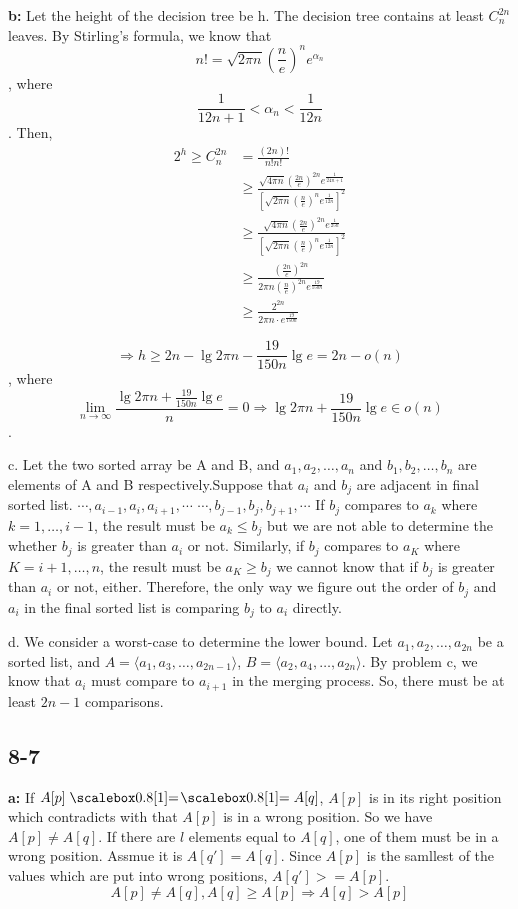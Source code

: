 \documentclass{book}
\begin{document}
\begin{CJK}{UTF8}{gkai}
\textbf{b:} Let the height of the decision tree be h. The decision tree contains 
at least $C^{2n}_n$ leaves.  By Stirling's formula, we know that $$n! = \sqrt{2\pi 
n}(\frac{n}{e})^ne^{\alpha_n}$$, where $$\frac{1}{12n+1} < \alpha_n < 
\frac{1}{12n}$$. Then,
\begin{align*}
2^h \geq C^{2n}_n &= \frac{(2n)!}{n!n!} \\
& \geq \frac{\sqrt{4\pi n}(\frac{2n}{e})^{2n}e^{\frac{1}{24n+1}}}{[\sqrt{2\pi 
n}(\frac{n}{e})^ne^{\frac{1}{12n}}]^2} \\
& \geq \frac{\sqrt{4\pi n}(\frac{2n}{e})^{2n}e^{\frac{1}{25n}}}{[\sqrt{2\pi 
n}(\frac{n}{e})^ne^{\frac{1}{12n}}]^2} \\
& \geq \frac{(\frac{2n}{e})^{2n}}{2\pi n(\frac{n}{e})^{2n}e^{\frac{19}{150n}}}  
\\
& \geq \frac{2^{2n}}{2\pi n\cdot e^{\frac{19}{150n}}}
\end{align*}

$$\Rightarrow h \geq 2n - \lg 2\pi n - \frac{19}{150n}\lg e = 2n - o(n)$$, where
$$\lim_{n \rightarrow \infty}\frac{\lg 2\pi n + \frac{19}{150n}\lg e}{n} = 0 
\Rightarrow \lg 2\pi n + \frac{19}{150n}\lg e \in o(n)$$.

c. Let the two sorted array be A and B, and $a_1, a_2, \ldots, a_n$ and $b_1, 
b_2, \ldots, b_n$ are elements of A and B respectively.Suppose that $a_i$ and 
$b_j$ are adjacent in final sorted list.
$\cdots, a_{i-1}, a_i, a_{i+1}, \cdots$
$\cdots, b_{j-1}, b_j, b_{j+1}, \cdots$
If $b_j$ compares to $a_k$ where $k = 1, \ldots, i-1$, the result must be $a_k 
\leq b_j$ but we are not able to determine the whether $b_j$ is greater than 
$a_i$ or not. Similarly, if $b_j$ compares to $a_K$ where $K = i+1, \ldots, n$, 
the result must be $a_K \ge b_j$ we cannot know that if $b_j$ is greater than 
$a_i$ or not, either. Therefore, the only way we figure out the order of $b_j$ 
and $a_i$ in the final sorted list is comparing $b_j$ to $a_i$ directly.

d. We consider a worst-case to determine the lower bound. Let $a_1, a_2, \ldots, 
a_{2n}$ be a sorted list, and $A = \langle a_1, a_3, \ldots, a_{2n-1}\rangle$, 
$B = \langle a_2, a_4, \ldots, a_{2n}\rangle$. By problem c, we know that $a_i$ 
must compare to $a_{i+1}$ in the merging process. So, there must be at least 
$2n-1$ comparisons.

\subsection*{8-7}
\textbf{a:} If $A[p] \isequal A[q]$, $A[p]$ is in its right position which 
contradicts with that $A[p]$ is in a wrong position. So we have $A[p] \neq 
A[q]$.  If there are $l$ elements equal to $A[q]$, one of them must be in a 
wrong position. Assmue it is $A[q'] = A[q]$. Since $A[p]$ is the samllest of the 
values which are put into wrong positions, $A[q'] >= A[p]$.
$$A[p]\neq A[q], A[q] \ge A[p] \Rightarrow A[q] > A[p]$$


\end{CJK}
\end{document}
